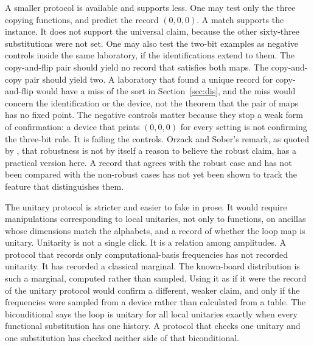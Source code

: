 \documentclass[11pt]{article}
\begin{document}
A smaller protocol is available and supports less. One may test only the three copying functions, and predict the record \((0,0,0)\). A match supports the instance. It does not support the universal claim, because the other sixty-three substitutions were not set. One may also test the two-bit examples as negative controls inside the same laboratory, if the identifications extend to them. The copy-and-flip pair should yield no record that satisfies both maps. The copy-and-copy pair should yield two. A laboratory that found a unique record for copy-and-flip would have a miss of the sort in Section~\ref{sec:dis}, and the miss would concern the identification or the device, not the theorem that the pair of maps has no fixed point. The negative controls matter because they stop a weak form of confirmation: a device that prints \((0,0,0)\) for every setting is not confirming the three-bit rule. It is failing the controls. Orzack and Sober's remark, as quoted by \citet{kuorikoski2007}, that robustness is not by itself a reason to believe the robust claim, has a practical version here. A record that agrees with the robust case and has not been compared with the non-robust cases has not yet been shown to track the feature that distinguishes them.

The unitary protocol is stricter and easier to fake in prose. It would require manipulations corresponding to local unitaries, not only to functions, on ancillas whose dimensions match the alphabets, and a record of whether the loop map is unitary. Unitarity is not a single click. It is a relation among amplitudes. A protocol that records only computational-basis frequencies has not recorded unitarity. It has recorded a classical marginal. The known-board distribution is such a marginal, computed rather than sampled. Using it as if it were the record of the unitary protocol would confirm a different, weaker claim, and only if the frequencies were sampled from a device rather than calculated from a table. The biconditional says the loop is unitary for all local unitaries exactly when every functional substitution has one history. A protocol that checks one unitary and one substitution has checked neither side of that biconditional.
\end{document}
